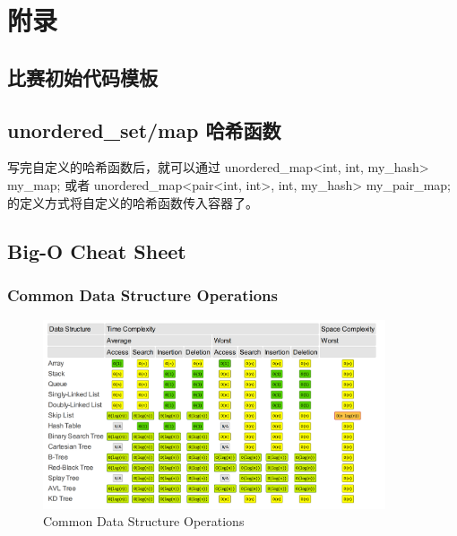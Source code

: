 \chapter{附录}

\begin{center}
\end{center}

\section{比赛初始代码模板}


\section{unordered\_set/map 哈希函数}

写完自定义的哈希函数后，就可以通过 unordered\_map<int, int, my\_hash> my\_map; 或者 unordered\_map<pair<int, int>, int, my\_hash> my\_pair\_map; 的定义方式将自定义的哈希函数传入容器了。

\section{Big-O Cheat Sheet}

\subsection{Common Data Structure Operations}
\begin{figure}[H] %
\centering %
\includegraphics[width=0.9\textwidth]{images_content/1.png} %
\caption{Common Data Structure Operations} %
\end{figure}

